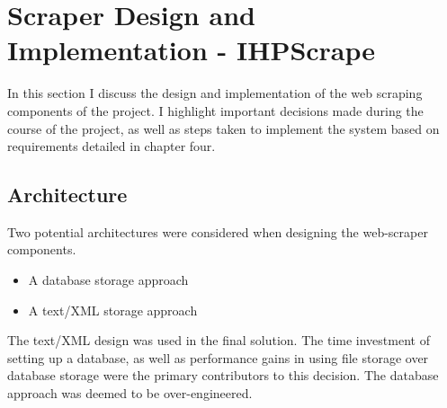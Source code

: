 \chapter{Scraper Design and Implementation - IHPScrape}\label{C:us}

In this section I discuss the design and implementation of the web scraping components of the project. I highlight important decisions made during the course of the project, as well as steps taken to implement the system based on requirements detailed in chapter four.






\section{Architecture}

Two potential architectures were considered when designing the web-scraper components.

\begin{itemize}
 \item A database storage approach
 \item A text/XML storage approach
\end{itemize}

The text/XML design was used in the final solution. The time investment of setting up a database, as well as performance gains in using file storage over database storage were the primary contributors to this decision. The database approach was deemed to be over-engineered. 


